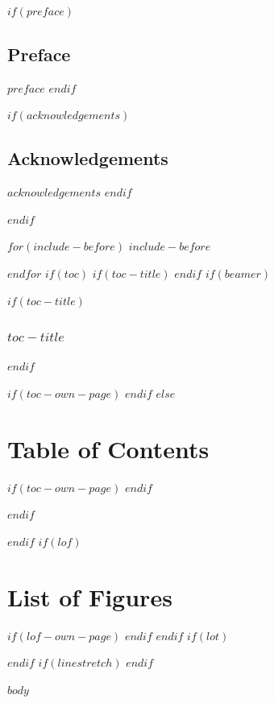 \documentclass[12pt]{article}
\begin{document}
$if(preface)$
\begin{center} %
\section{\centering Preface}
\end{center}
$preface$
\thispagestyle{empty}
\pagebreak
\restoregeometry
$endif$

$if(acknowledgements)$
\begin{center} %
\section{\centering Acknowledgements}
\end{center}
$acknowledgements$
\thispagestyle{empty}
\pagebreak
\restoregeometry
$endif$

$endif$

$for(include-before)$
$include-before$

$endfor$
$if(toc)$
$if(toc-title)$
\renewcommand*\contentsname{$toc-title$}
$endif$
$if(beamer)$
\begin{frame}[allowframebreaks]
$if(toc-title)$
  \frametitle{$toc-title$}
$endif$
  \tableofcontents[hideallsubsections]
\end{frame}
$if(toc-own-page)$
\newpage
$endif$
$else$
{
\tableofcontents
\section{Table of Contents}
$if(toc-own-page)$
\newpage
$endif$
}
$endif$

$endif$
$if(lof)$
\listoffigures
\section{List of Figures}
$if(lof-own-page)$
\newpage
$endif$
$endif$
$if(lot)$
\listoftables
$endif$
$if(linestretch)$
$endif$
\sloppy

\setlength{\parskip}{0.5em}

$body$
\end{document}
